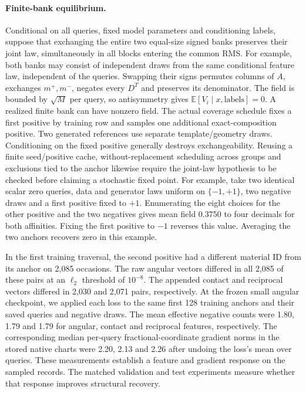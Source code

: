 \paragraph{Finite-bank equilibrium.}
Conditional on all queries, fixed model parameters and conditioning labels, suppose that
exchanging the entire two equal-size signed banks preserves their joint law, simultaneously in
all blocks entering the common RMS. For example, both banks may consist of independent draws from
the same conditional feature law, independent of the queries. Swapping their signs permutes
columns of \(A\), exchanges \(m^+,m^-\), negates every \(D^T\) and preserves its denominator.
The field is bounded by \(\sqrt M\) per query, so antisymmetry gives
\(\mathbb E[V_i\mid x,\mathrm{labels}]=0\). A realized finite bank can have nonzero field.
The actual coverage schedule fixes a first positive by training row and samples one additional
exact-composition positive. Two generated references use separate template/geometry draws.
Conditioning on the fixed positive generally destroys exchangeability. Reusing a finite
seed/positive cache, without-replacement scheduling across groups and exclusions tied to
the anchor likewise require the joint-law hypothesis to be checked before claiming a stochastic
fixed point. For example, take two identical scalar zero queries, data and generator laws
uniform on \(\{-1,+1\}\), two negative draws and a first positive fixed to \(+1\). Enumerating
the eight choices for the other positive and the two negatives gives mean field \(0.3750\)
to four decimals for both affinities. Fixing the first positive to \(-1\) reverses this value.
Averaging the two anchors recovers zero in this example.

In the first training traversal, the second positive had a different material ID
from its anchor on 2,085 occasions. The raw angular vectors differed in all
2,085 of these pairs at an \(\ell_2\) threshold of \(10^{-8}\). The appended
contact and reciprocal vectors differed in 2,030 and 2,071 pairs, respectively.
At the frozen small angular checkpoint, we applied each loss to the same
first 128 training anchors and their saved queries and negative draws.
The mean effective negative counts were 1.80, 1.79 and 1.79 for angular,
contact and reciprocal features, respectively. The corresponding median
per-query fractional-coordinate gradient norms in the stored native charts were 2.20, 2.13 and 2.26
after undoing the loss's mean over queries. These measurements establish a
feature and gradient response on the sampled records. The matched validation
and test experiments measure whether that response improves structural recovery.

